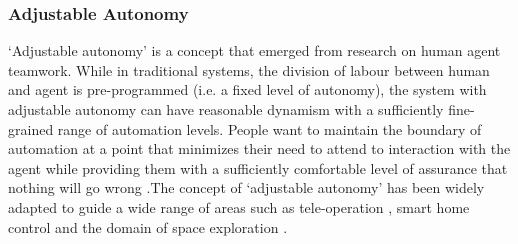 
\subsubsection{Adjustable Autonomy}
`Adjustable  autonomy' is a concept that emerged from research on human agent teamwork. While in traditional systems, the division of labour between human and agent is pre-programmed (i.e. a fixed level of autonomy),  the system with adjustable autonomy can have reasonable dynamism with a sufficiently fine-grained range of automation levels. People want to maintain the boundary of automation at a point that minimizes their need to attend to interaction with the agent while providing them with a sufficiently comfortable level of assurance that nothing will go wrong \citep{Bradshaw2003}.The concept of `adjustable autonomy' has been widely adapted to guide a wide range of areas such as tele-operation \citep{Schwarz2014,Goodrich2001a}, smart home control \citep{Costanza2014} and the domain of space exploration  \citep{Doraisa}. \\

